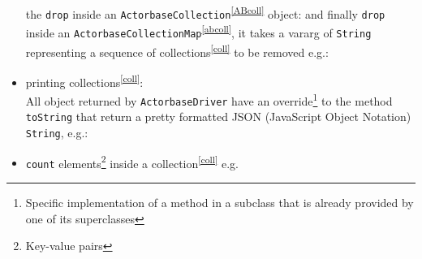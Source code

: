 \documentclass{scalatekids-article}
\begin{document}
\begin{itemize}
  the \verb=drop= inside an \verb=ActorbaseCollection=\textsuperscript{\ref{ABcoll}} object:
  and finally \verb=drop= inside an \verb=ActorbaseCollectionMap=\textsuperscript{\ref{abcoll}}, it takes a
  vararg of \verb=String= representing a sequence of collections\textsuperscript{\ref{coll}} to be removed
  e.g.:
\item printing collections\textsuperscript{\ref{coll}}:\\All object returned by \verb=ActorbaseDriver=
  have an override\footnote{Specific implementation of a method in a subclass that
    is already provided by one of its superclasses} to the method \verb=toString=
  that return a pretty formatted JSON (JavaScript Object Notation) \verb=String=, e.g.:
\item \verb=count= elements\footnote{Key-value pairs} inside a collection\textsuperscript{\ref{coll}} e.g.


\end{itemize}
\end{document}
